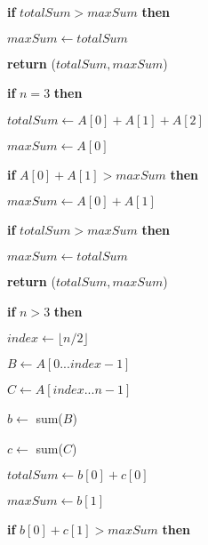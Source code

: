 \documentclass{article}
\begin{document}
\hspace{8ex}			\textbf{if} $totalSum > maxSum$ \textbf{then}

\hspace{12ex}				$maxSum \leftarrow totalSum$

\hspace{8ex}			\textbf{return} ($totalSum, maxSum$)

\hspace{4ex}		\textbf{if} $n = 3$ \textbf{then}

\hspace{8ex}			$totalSum \leftarrow A[0] + A[1] + A[2]$

\hspace{8ex}			$maxSum \leftarrow A[0]$

\hspace{8ex}			\textbf{if} $A[0] + A[1] > maxSum$ \textbf{then}

\hspace{12ex}				$maxSum \leftarrow A[0] + A[1]$

\hspace{8ex}			\textbf{if} $totalSum > maxSum$ \textbf{then}

\hspace{12ex}				$maxSum \leftarrow totalSum$

\hspace{8ex}			\textbf{return} ($totalSum, maxSum$)

\hspace{4ex}			\textbf{if} $n > 3$ \textbf{then}

\hspace{8ex}			$index \leftarrow \lfloor n/2 \rfloor$

\hspace{8ex}			$B \leftarrow A[0 ... index - 1]$

\hspace{8ex}			$C \leftarrow A[index ... n - 1]$

\hspace{8ex}			$b \leftarrow$ sum($B$)

\hspace{8ex}			$c \leftarrow$ sum($C$)

\hspace{8ex}			$totalSum \leftarrow b[0] + c[0]$

\hspace{8ex}			$maxSum \leftarrow b[1]$

\hspace{8ex}			\textbf{if} $b[0] + c[1] > maxSum$ \textbf{then}
\end{document}

